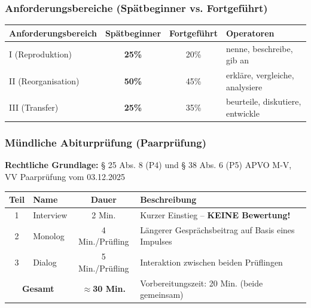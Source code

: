 \documentclass[10pt,a4paper]{article}
\begin{document}
\subsubsection{Anforderungsbereiche (Spätbeginner vs. Fortgeführt)}

\begin{center}
\begin{tabular}{|l|c|c|p{4cm}|}
\hline
\rowcolor{lightgray}
\textbf{Anforderungsbereich} & \textbf{Spätbeginner} & \textbf{Fortgeführt} & \textbf{Operatoren} \\
\hline
I (Reproduktion) & \textcolor{spaet}{\textbf{25\%}} & 20\% & nenne, beschreibe, gib an \\
\hline
II (Reorganisation) & \textcolor{spaet}{\textbf{50\%}} & 45\% & erkläre, vergleiche, analysiere \\
\hline
III (Transfer) & \textcolor{spaet}{\textbf{25\%}} & 35\% & beurteile, diskutiere, entwickle \\
\hline
\end{tabular}
\end{center}

\subsubsection{Mündliche Abiturprüfung (Paarprüfung)}

\textbf{Rechtliche Grundlage:} § 25 Abs. 8 (P4) und § 38 Abs. 6 (P5) APVO M-V, VV Paarprüfung vom 03.12.2025

\begin{center}
\begin{tabular}{|c|p{3.5cm}|c|p{6cm}|}
\hline
\rowcolor{spaet}\color{white}\textbf{Teil} & \color{white}\textbf{Name} & \color{white}\textbf{Dauer} & \color{white}\textbf{Beschreibung} \\
\hline
1 & Interview & 2 Min. & Kurzer Einstieg -- \textbf{KEINE Bewertung!} \\
\hline
2 & Monolog & 4 Min./Prüfling & Längerer Gesprächsbeitrag auf Basis eines Impulses \\
\hline
3 & Dialog & 5 Min./Prüfling & Interaktion zwischen beiden Prüflingen \\
\hline
\multicolumn{2}{|c|}{\textbf{Gesamt}} & \textbf{$\approx$30 Min.} & Vorbereitungszeit: 20 Min. (beide gemeinsam) \\
\hline
\end{tabular}
\end{center}

\newpage
\end{document}
